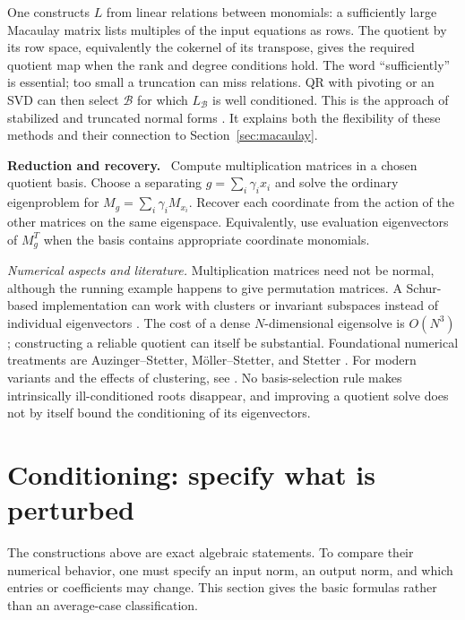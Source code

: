 \documentclass[12pt]{article}
\def\B{\mathcal{B}}
\theoremstyle{definition}
\theoremstyle{remark}
\newenvironment{reduction}
  {\par\medskip\noindent\textbf{Reduction and recovery.}\ }
  {\par\medskip}
\begin{document}
One constructs $L$ from linear relations between monomials: a sufficiently large
Macaulay matrix lists multiples of the input equations as rows. The quotient by
its row space, equivalently the cokernel of its transpose, gives the required
quotient map when the rank and degree conditions hold. The word
``sufficiently'' is essential; too small a truncation can miss relations.
QR with pivoting or an SVD can then select $\B$ for which $L_\B$ is well conditioned.
This is the approach of stabilized and truncated normal forms
\cite{telen2018stabilized,telen2018truncated,mourrain2021truncated}. It explains
both the flexibility of these methods and their connection to
Section~\ref{sec:macaulay}.

\begin{reduction}
Compute multiplication matrices in a chosen quotient basis. Choose a separating
$g=\sum_i\gamma_i x_i$ and solve the ordinary eigenproblem for
$M_g=\sum_i\gamma_i M_{x_i}$. Recover each coordinate from the action of the other
matrices on the same eigenspace. Equivalently, use evaluation eigenvectors of
$M_g^T$ when the basis contains appropriate coordinate monomials.
\end{reduction}

\emph{Numerical aspects and literature.} Multiplication matrices need not be normal,
although the running example happens to give permutation matrices. A Schur-based
implementation can work with clusters or invariant subspaces instead of individual
eigenvectors \cite{corless1997reordered}. The cost of a dense $N$-dimensional
eigensolve is $O(N^3)$; constructing a reliable quotient can itself be substantial.
Foundational numerical treatments are Auzinger--Stetter, M\"oller--Stetter, and
Stetter \cite{auzinger1988elimination,moller1995multivariate,stetter1996matrix,
stetter2004numerical}. For modern variants and the effects of clustering, see
\cite{telen2018truncated,parkinson2022analysis}. No basis-selection rule makes
intrinsically ill-conditioned roots disappear, and improving a quotient solve
does not by itself bound the conditioning of its eigenvectors.

\section{Conditioning: specify what is perturbed}\label{sec:conditioning}

The constructions above are exact algebraic statements. To compare their numerical
behavior, one must specify an input norm, an output norm, and which entries or
coefficients may change. This section gives the basic formulas rather than an
average-case classification.
\end{document}
